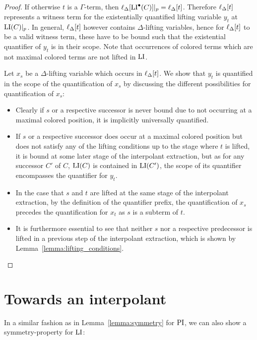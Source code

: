 \begin{proof}
	If otherwise $t$ is a $\Gamma$-term, then $\ell_{\Delta}[\operatorname{LI}^\bullet(C)]|_{p} = \ell_{\Delta}[t]$.
	Therefore $\ell_{\Delta}[t]$ represents a witness term for the existentially quantified lifting variable $y_t$ at $\operatorname{LI}(C)|_{p}$.
	In general, $\ell_{\Delta}[t]$ however contains $\Delta$-lifting variables, hence for $\ell_{\Delta}[t]$ to be a valid witness term, these have to be bound such that the existential quantifier of $y_t$ is in their scope.
	Note that occurrences of colored terms which are not maximal colored terms are not lifted in $\operatorname{LI}$.

	Let $x_s$ be a $\Delta$-lifting variable which occurs in $\ell_{\Delta}[t]$. 
	We show that $y_t$ is quantified in the scope of the quantification of $x_s$ by discussing the different possibilities for quantification of $x_s$:

	\begin{itemize}
		\item
			Clearly if $s$ or a respective successor is never bound due to not occurring at a maximal colored position, it is implicitly universally quantified.

		\item
			If $s$ or a respective successor does occur at a maximal colored position but does not satisfy any of the lifting conditions up to the stage where $t$ is lifted, it is bound at some later stage of the interpolant extraction, but as for any successor $C'$ of $C$, $\operatorname{LI}(C)$ is contained in $\operatorname{LI}(C')$, 
			the scope of its quantifier encompasses the quantifier for $y_t$.

		\item
			In the case that $s$ and $t$ are lifted at the same stage of the interpolant extraction, by the definition of the quantifier prefix, the quantification of $x_s$ precedes the quantification for $x_t$ as $s$ is a subterm of $t$.


		\item
			It is furthermore essential to see that neither $s$ nor a respective predecessor is lifted in a previous step of the interpolant extraction, which is shown by Lemma~\ref{lemma:lifting_conditions}.
			\qedhere
	\end{itemize}
\end{proof}

\section{Towards an interpolant}

In a similar fashion as in Lemma~\ref{lemma:symmetry} for $\operatorname{PI}$, we can also show a symmetry-property for $\operatorname{LI}$:

